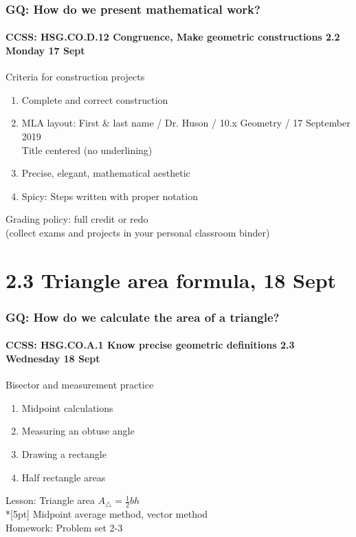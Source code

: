 \documentclass{beamer}
\begin{document}
  \frame
  {
    \frametitle{GQ: How do we present mathematical work?}
    \framesubtitle{CCSS: HSG.CO.D.12 Congruence, Make geometric constructions  \hfill \alert{2.2 Monday 17 Sept}}

    \begin{block}{Criteria for construction projects}
    \begin{enumerate}
        \item Complete and correct construction
        \item MLA layout: First \& last name / Dr. Huson / 10.x Geometry / 17 September 2019 \\
        Title centered (no underlining)
        \item Precise, elegant, mathematical aesthetic
        \item Spicy: Steps written with proper notation
    \end{enumerate}
    \end{block}
    Grading policy: full credit or redo\\[5pt]
    (collect exams and projects in your personal classroom binder)
  }

\section{2.3 Triangle area formula, 18 Sept}
    \frame
    {
      \frametitle{GQ: How do we calculate the area of a triangle?}
      \framesubtitle{CCSS: HSG.CO.A.1 Know precise geometric definitions \hfill \alert{2.3 Wednesday 18 Sept}}
  
      \begin{block}{Bisector and measurement practice}
      \begin{enumerate}
        \item Midpoint calculations
        \item Measuring an obtuse angle
        \item Drawing a rectangle
        \item Half rectangle areas
      \end{enumerate}
      \end{block}
      Lesson: Triangle area $A_{\triangle} = \frac{1}{2}bh$ \\*[5pt]
      Midpoint average method, vector method\\ \smallskip
      Homework: Problem set 2-3 
    }
\end{document}
